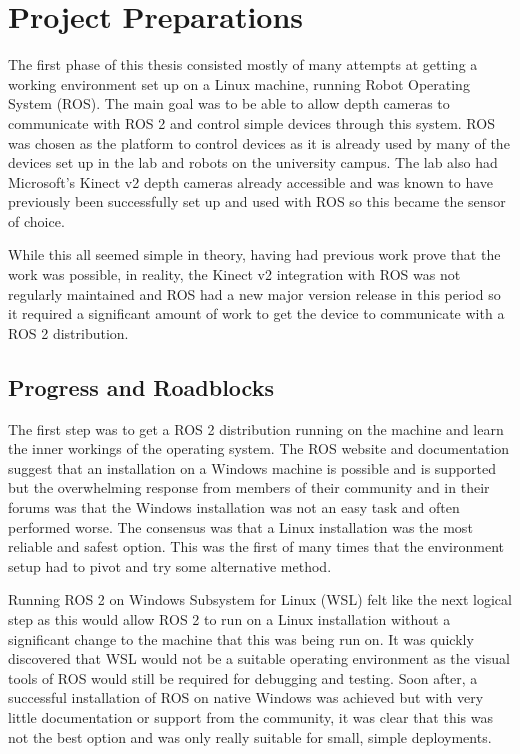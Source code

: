 \chapter{Project Preparations}\label{ch:project_prep}
The first phase of this thesis consisted mostly of many attempts at getting a working environment set up on a Linux machine, running Robot Operating System (ROS).
The main goal was to be able to allow depth cameras to communicate with ROS 2 and control simple devices through this system.
ROS was chosen as the platform to control devices as it is already used by many of the devices set up in the lab and robots on the university campus.
The lab also had Microsoft's Kinect v2 depth cameras already accessible and was known to have previously been successfully set up and used with ROS so this became the sensor of choice.

While this all seemed simple in theory, having had previous work prove that the work was possible, in reality, the Kinect v2 integration with ROS was not regularly maintained and ROS had a new major version release in this period so it required a significant amount of work to get the device to communicate with a ROS 2 distribution.

\section{Progress and Roadblocks}

The first step was to get a ROS 2 distribution running on the machine and learn the inner workings of the operating system.
The ROS website and documentation suggest that an installation on a Windows machine is possible and is supported but the overwhelming response from members of their community and in their forums was that the Windows installation was not an easy task and often performed worse.
The consensus was that a Linux installation was the most reliable and safest option.
This was the first of many times that the environment setup had to pivot and try some alternative method.

Running ROS 2 on Windows Subsystem for Linux (WSL) felt like the next logical step as this would allow ROS 2 to run on a Linux installation without a significant change to the machine that this was being run on.
It was quickly discovered that WSL would not be a suitable operating environment as the visual tools of ROS would still be required for debugging and testing.
Soon after, a successful installation of ROS on native Windows was achieved but with very little documentation or support from the community, it was clear that this was not the best option and was only really suitable for small, simple deployments.


